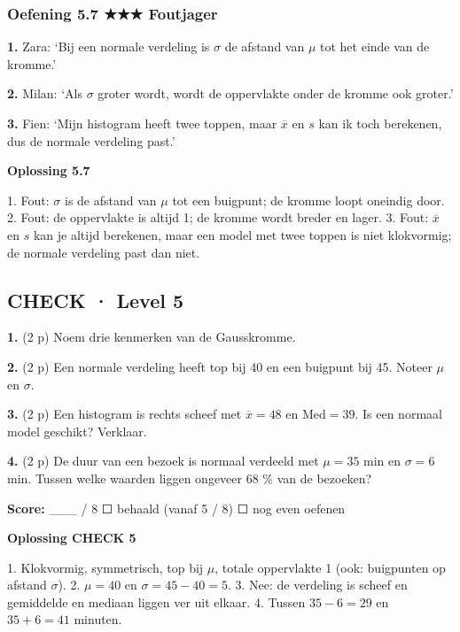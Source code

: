 \subsubsection*{Oefening 5.7 \quad ★★★ \quad Foutjager}

\textbf{1.} Zara: ‘Bij een normale verdeling is $\sigma$ de afstand van $\mu$ tot het einde van de kromme.’ \lijn

\textbf{2.} Milan: ‘Als $\sigma$ groter wordt, wordt de oppervlakte onder de kromme ook groter.’ \lijn

\textbf{3.} Fien: ‘Mijn histogram heeft twee toppen, maar $\overline{x}$ en $s$ kan ik toch berekenen, dus de normale verdeling past.’ \lijn

\begin{oplossing}
\textbf{Oplossing 5.7}

1. Fout: $\sigma$ is de afstand van $\mu$ tot een buigpunt; de kromme loopt oneindig door. 2. Fout: de oppervlakte is altijd 1; de kromme wordt breder en lager. 3. Fout: $\overline{x}$ en $s$ kan je altijd berekenen, maar een model met twee toppen is niet klokvormig; de normale verdeling past dan niet.
\end{oplossing}

\subsection*{CHECK · Level 5}

\textbf{1.} (2 p) Noem drie kenmerken van de Gausskromme. \lijn

\textbf{2.} (2 p) Een normale verdeling heeft top bij 40 en een buigpunt bij 45. Noteer $\mu$ en $\sigma$. \lijn

\textbf{3.} (2 p) Een histogram is rechts scheef met $\overline{x}=48$ en $\text{Med}=39$. Is een normaal model geschikt? Verklaar. \lijn

\textbf{4.} (2 p) De duur van een bezoek is normaal verdeeld met $\mu=35$ min en $\sigma=6$ min. Tussen welke waarden liggen ongeveer 68 \% van de bezoeken? \lijn

\begin{doel}
\textbf{Score:} \_\_\_ / 8 \quad ☐ behaald (vanaf 5 / 8) \quad ☐ nog even oefenen
\end{doel}

\begin{oplossing}
\textbf{Oplossing CHECK 5}

1. Klokvormig, symmetrisch, top bij $\mu$, totale oppervlakte 1 (ook: buigpunten op afstand $\sigma$). 2. $\mu=40$ en $\sigma=45-40=5$. 3. Nee: de verdeling is scheef en gemiddelde en mediaan liggen ver uit elkaar. 4. Tussen $35-6=29$ en $35+6=41$ minuten.
\end{oplossing}
